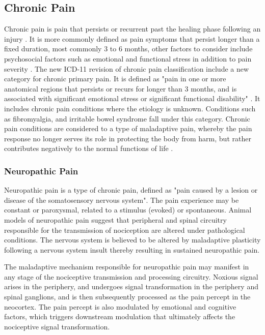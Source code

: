 \subsection{Chronic Pain}

Chronic pain is pain that persists or recurrent past the healing phase following an injury \cite{Apkarian2009,Merskey2012}. It is more commonly defined as pain symptoms that persist longer than a fixed duration, most commonly 3 to 6 months, other factors to consider include psychosocial factors such as emotional and functional stress in addition to pain severity \cite{Treede2015}. The new ICD-11 revision of chronic pain classification include a new category for chronic primary pain. It is defined as "pain in one or more anatomical regions that persists or recurs for longer than 3 months, and is associated with significant emotional stress or significant functional disability" \cite{Treede2015}. It includes chronic pain conditions where the etiology is unknown. Conditions such as fibromyalgia, and irritable bowel syndrome fall under this category. Chronic pain conditions are considered to a type of maladaptive pain, whereby the pain response no longer serves its role in protecting the body from harm, but rather contributes negatively to the normal functions of life \cite{May2008}. 


\subsubsection{Neuropathic Pain}

Neuropathic pain is a type of chronic pain, defined as "pain caused by a lesion or disease of the somatosensory nervous system"\cite{Merskey2012}. The pain experience may be constant or paroxysmal, related to a stimulus (evoked) or spontaneous. Animal models of neuropathic pain suggest that peripheral and spinal circuitry responsible for the transmission of nociception are altered under pathological conditions. The nervous system is believed to be altered by maladaptive plasticity following a nervous system insult thereby resulting in sustained neuropathic pain.

The maladaptive mechanism responsible for neuropathic pain may manifest in any stage of the nociceptive transmission and processing circuitry. 
Noxious signal arises in the periphery, and undergoes signal transformation in the periphery and spinal ganglions, and is then subsequently processed as the pain percept in the neocortex. The pain percept is also modulated by emotional and cognitive factors, which triggers downstream modulation that ultimately affects the nociceptive signal transformation. 

